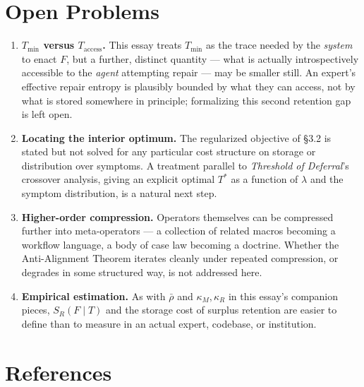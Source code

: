 \documentclass[11pt]{article}
\begin{document}
\section*{Open Problems}

\begin{enumerate}
\item \textbf{$T_{\min}$ versus $T_{\mathrm{access}}$.} This essay treats $T_{\min}$ as the trace needed by the \emph{system} to enact $F$, but a further, distinct quantity — what is actually introspectively accessible to the \emph{agent} attempting repair — may be smaller still. An expert's effective repair entropy is plausibly bounded by what they can access, not by what is stored somewhere in principle; formalizing this second retention gap is left open.
\item \textbf{Locating the interior optimum.} The regularized objective of \S 3.2 is stated but not solved for any particular cost structure on storage or distribution over symptoms. A treatment parallel to \emph{Threshold of Deferral}'s crossover analysis, giving an explicit optimal $T^*$ as a function of $\lambda$ and the symptom distribution, is a natural next step.
\item \textbf{Higher-order compression.} Operators themselves can be compressed further into meta-operators — a collection of related macros becoming a workflow language, a body of case law becoming a doctrine. Whether the Anti-Alignment Theorem iterates cleanly under repeated compression, or degrades in some structured way, is not addressed here.
\item \textbf{Empirical estimation.} As with $\bar\rho$ and $\kappa_M,\kappa_R$ in this essay's companion pieces, $S_R(F\mid T)$ and the storage cost of surplus retention are easier to define than to measure in an actual expert, codebase, or institution.
\end{enumerate}

\section*{References}
\end{document}
